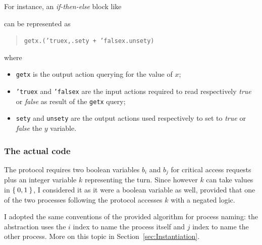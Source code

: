\documentclass[10pt,a4paper]{article}
\newcommand{\CCSCode}[1]{{\tt #1}}
\begin{document}
            \noindent For instance, an \emph{if-then-else} block like
            \begin{quote}
                \begin{algorithm}[H]
                \end{algorithm}
            \end{quote}
            can be represented as
            \begin{quote}
            \CCSCode{getx.('truex,.sety + 'falsex.unsety)}
            \end{quote}
            where
            \begin{itemize}

            \item   \CCSCode{getx} is the output action querying for the
                    value of $x$;

            \item   \CCSCode{'truex} and \CCSCode{'falsex} are the input
                    actions required to read respectively \emph{true} or
                    \emph{false} as result of the \CCSCode{getx} query;

            \item   \CCSCode{sety} and \CCSCode{unsety} are the output
                    actions used respectively to set to \emph{true} or
                    \emph{false} the $y$ variable.

            \end{itemize}

        \subsubsection{The actual code}
        \label{subsub:ActualCode}

            The protocol requires two boolean variables $b_i$ and $b_j$
            for critical access requests plus an integer variable $k$
            representing the turn. Since however $k$ can take values in
            $\Set{0, 1}$, I considered it as it were a boolean variable as
            well, provided that one of the two processes following the
            protocol accesses $k$ with a negated logic.

            I adopted the same conventions of the provided algorithm for
            process naming: the abstraction uses the $i$ index to name the
            process itself and $j$ index to name the other process. More
            on this topic in Section~\ref{sec:Instantiation}.
\end{document}
